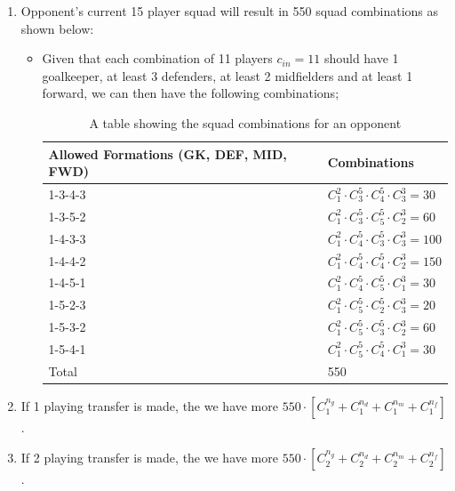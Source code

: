 					\begin{enumerate}
						\item[i.] Opponent’s current 15 player squad will result in 550 squad combinations as shown below:
						\begin{itemize}
							\item 	Given that each combination of 11 players  $c_{in}=11$ should have 1 goalkeeper, at least 3 defenders, at least 2 midfielders and at least 1 forward, we can then have the following combinations;
							\begin{table}[ht]
								\begin{center}
									\begin{tabular}{|l|l|}
										\hline
										Allowed Formations (GK, DEF, MID, FWD)& Combinations\\
										\hline
										1-3-4-3 & $C_1^2 \cdot C_3^5 \cdot C_4^5 \cdot C_3^3 =30$\\
										\hline
										1-3-5-2 & $C_1^2 \cdot C_3^5 \cdot C_5^5 \cdot C_2^3=60$\\
										\hline
										1-4-3-3 & $C_1^2 \cdot C_4^5 \cdot C_3^5 \cdot C_3^3=100$\\
										\hline
										1-4-4-2 & $C_1^2 \cdot C_4^5 \cdot C_4^5 \cdot C_2^3=150$\\
										\hline
										1-4-5-1 & $C_1^2 \cdot C_4^5 \cdot C_5^5 \cdot C_1^3=30$\\
										\hline
										1-5-2-3 & $C_1^2 \cdot C_5^5 \cdot C_2^5 \cdot C_3^3=20$\\
										\hline
										1-5-3-2 & $C_1^2 \cdot C_5^5 \cdot C_3^5 \cdot C_2^3=60$\\
										\hline
										1-5-4-1 & $C_1^2 \cdot C_5^5 \cdot C_4^5 \cdot C_1^3=30$\\
										\hline
										Total   & 550\\
										\hline
									\end{tabular}
								\end{center}
								\caption{A table showing the squad combinations for an opponent}
							\end{table}

						\end{itemize}
						\item[ii.] If 1 playing transfer is made, the we have more $550 \cdot [C_1^{n_g} +C_1^{n_d}+C_1^{n_m} +C_1^{n_f}]$.
						\item[iii.] If 2 playing transfer is made, the we have more $550 \cdot  [C_2^{n_g} +C_2^{n_d}+C_2^{n_m} +C_2^{n_f}]$.
					\end{enumerate}

